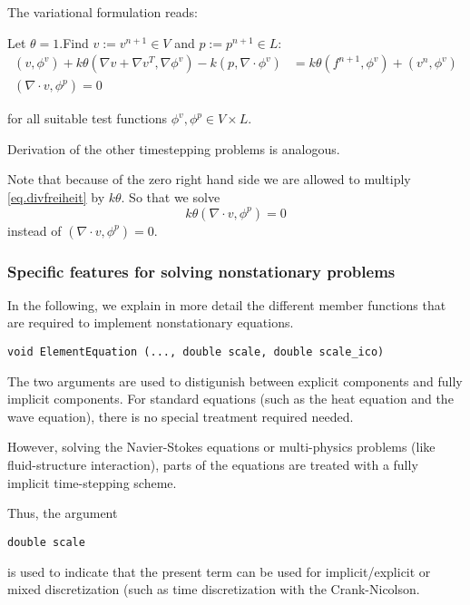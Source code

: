 The variational formulation reads:

\begin{Problem}
Let $\theta =1$.Find $v:= v^{n+1}\in V$ and $p:= p^{n+1}\in L$:
\begin{align}
(v,\phi^v) + k\theta (\nabla v + \nabla v^{T}, \nabla\phi^v) 
- k  (p, \nabla\cdot\phi^v) &=
k\theta (f^{n+1},\phi^v) +  (v^n,\phi^v)\\
(\nabla \cdot v,\phi^p) = 0  \label{eq.divfreiheit}
\end{align}
\end{Problem}
for all suitable test functions ${\phi^v , \phi^p} \in V\times L$. 


Derivation of the other timestepping problems is analogous.
\begin{remark}
Note that because of the zero right hand side we are allowed to multiply \eqref{eq.divfreiheit} by $k\theta$. So that we solve $$k\theta(\nabla \cdot v,\phi^p) = 0$$ instead of $(\nabla \cdot v,\phi^p) = 0$. 
\end{remark}


\subsubsection{Specific features for 
solving nonstationary problems}

In the following, we explain in more detail the 
different member functions that are required to
implement nonstationary equations.

\begin{verbatim}
void ElementEquation (..., double scale, double scale_ico)
\end{verbatim}
The two arguments 
are used to distigunish between explicit 
components and fully implicit components. 
For standard equations (such as the heat 
equation and the wave equation), there is 
no special treatment required needed. 

However, solving the Navier-Stokes equations or 
multi-physics problems (like fluid-structure
interaction), parts of the equations are treated
with a fully implicit time-stepping scheme.

Thus, the argument
\begin{verbatim}
double scale
\end{verbatim}
is used to indicate that the present term 
can be used for implicit/explicit or mixed 
discretization (such as time discretization with
the Crank-Nicolson.

